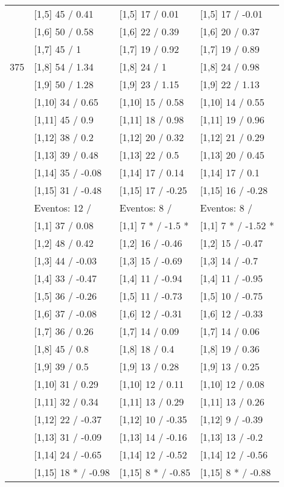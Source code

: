 \begin{table}
\begin{tabular}[t]{llll}
 & {}[1,5] 45  / 0.41 & {}[1,5] 17  / 0.01 & {}[1,5] 17  / -0.01\\
 & {}[1,6] 50  / 0.58 & {}[1,6] 22  / 0.39 & {}[1,6] 20  / 0.37\\
 & {}[1,7] 45  / 1 & {}[1,7] 19  / 0.92 & {}[1,7] 19  / 0.89\\
375 & {}[1,8] 54  / 1.34 & {}[1,8] 24  / 1 & {}[1,8] 24  / 0.98\\
\addlinespace
 & {}[1,9] 50  / 1.28 & {}[1,9] 23  / 1.15 & {}[1,9] 22  / 1.13\\
 & {}[1,10] 34  / 0.65 & {}[1,10] 15  / 0.58 & {}[1,10] 14  / 0.55\\
 & {}[1,11] 45  / 0.9 & {}[1,11] 18  / 0.98 & {}[1,11] 19  / 0.96\\
 & {}[1,12] 38  / 0.2 & {}[1,12] 20  / 0.32 & {}[1,12] 21  / 0.29\\
 & {}[1,13] 39  / 0.48 & {}[1,13] 22  / 0.5 & {}[1,13] 20  / 0.45\\
\addlinespace
 & {}[1,14] 35  / -0.08 & {}[1,14] 17  / 0.14 & {}[1,14] 17  / 0.1\\
 & {}[1,15] 31  / -0.48 & {}[1,15] 17  / -0.25 & {}[1,15] 16  / -0.28\\
 & Eventos:  12 / & Eventos:  8 / & Eventos:  8 /\\
 & {}[1,1] 37  / 0.08 & {}[1,1] 7 * / -1.5 * & {}[1,1] 7 * / -1.52 *\\
 & {}[1,2] 48  / 0.42 & {}[1,2] 16  / -0.46 & {}[1,2] 15  / -0.47\\
\addlinespace
 & {}[1,3] 44  / -0.03 & {}[1,3] 15  / -0.69 & {}[1,3] 14  / -0.7\\
 & {}[1,4] 33  / -0.47 & {}[1,4] 11  / -0.94 & {}[1,4] 11  / -0.95\\
 & {}[1,5] 36  / -0.26 & {}[1,5] 11  / -0.73 & {}[1,5] 10  / -0.75\\
 & {}[1,6] 37  / -0.08 & {}[1,6] 12  / -0.31 & {}[1,6] 12  / -0.33\\
 & {}[1,7] 36  / 0.26 & {}[1,7] 14  / 0.09 & {}[1,7] 14  / 0.06\\
\addlinespace
500 & {}[1,8] 45  / 0.8 & {}[1,8] 18  / 0.4 & {}[1,8] 19  / 0.36\\
 & {}[1,9] 39  / 0.5 & {}[1,9] 13  / 0.28 & {}[1,9] 13  / 0.25\\
 & {}[1,10] 31  / 0.29 & {}[1,10] 12  / 0.11 & {}[1,10] 12  / 0.08\\
 & {}[1,11] 32  / 0.34 & {}[1,11] 13  / 0.29 & {}[1,11] 13  / 0.26\\
 & {}[1,12] 22  / -0.37 & {}[1,12] 10  / -0.35 & {}[1,12] 9  / -0.39\\
\addlinespace
 & {}[1,13] 31  / -0.09 & {}[1,13] 14  / -0.16 & {}[1,13] 13  / -0.2\\
 & {}[1,14] 24  / -0.65 & {}[1,14] 12  / -0.52 & {}[1,14] 12  / -0.56\\
 & {}[1,15] 18 * / -0.98 & {}[1,15] 8 * / -0.85 & {}[1,15] 8 * / -0.88\\
\bottomrule
\end{tabular}
\end{table}
